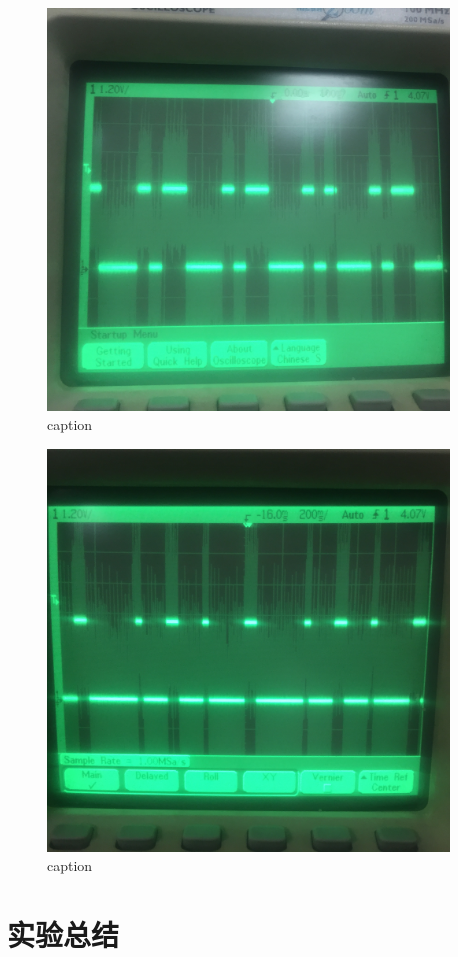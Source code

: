 \documentclass{ctexart}
\begin{document}
\begin{figure}[htbp]
    \centering
    \includegraphics[width=0.95\textwidth]{figs/correct}
    \caption{caption}
    \label{fig:correct}
\end{figure}

\begin{figure}[htbp]
    \centering
    \includegraphics[width=0.95\textwidth]{figs/wrong}
    \caption{caption}
    \label{fig:wrong}
\end{figure}

\section{实验总结}
\end{document}
